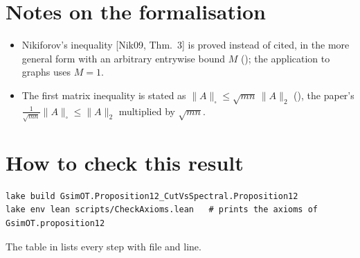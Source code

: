 \section{Notes on the formalisation}
\begin{itemize}
\item Nikiforov's inequality [Nik09, Thm.~3] is proved instead of cited, in the more general form with an arbitrary
  entrywise bound $M$ (); the application to graphs uses $M=1$.
\item The first matrix inequality is stated as $\|A\|_\square\le\sqrt{mn}\,\|A\|_2$
  (), the paper's $\frac1{\sqrt{mn}}\|A\|_\square\le\|A\|_2$ multiplied by $\sqrt{mn}$.
\end{itemize}

\section{How to check this result}
\begin{verbatim}
lake build GsimOT.Proposition12_CutVsSpectral.Proposition12
lake env lean scripts/CheckAxioms.lean   # prints the axioms of GsimOT.proposition12
\end{verbatim}
The table in  lists every step with file and line.

